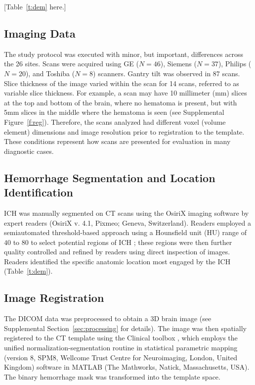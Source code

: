 \documentclass[10pt]{article}\usepackage[]{graphicx}\usepackage[]{color}
\begin{document}

[Table~\ref{t:dem} here.]


\subsection{Imaging Data}
The study protocol was executed with minor, but important, differences across the 26 sites.  Scans were acquired using GE ($N=46$), Siemens ($N=37$), Philips ($N=20$), and Toshiba ($N=8$) scanners. Gantry tilt was observed in 87 scans.  Slice thickness of the image varied within the scan for 14 scans, referred to as variable slice thickness. For example, a scan may have 10 millimeter (mm) slices at the top and bottom of the brain, where no hematoma is present, but with 5mm slices in the middle where the hematoma is seen (see Supplemental Figure~\ref{f:reg}\protect{}).  Therefore, the scans analyzed had different voxel (volume element) dimensions and image resolution prior to registration to the template.  These conditions represent how scans are presented for evaluation in many diagnostic cases.



\subsection{Hemorrhage Segmentation and Location Identification}
ICH was manually segmented on CT scans using the OsiriX imaging software by expert readers (OsiriX v. 4.1, Pixmeo; Geneva, Switzerland).  Readers employed a semiautomated threshold-based approach using a Hounsfield unit (HU) range of $40$ to $80$ to select potential regions of ICH \citep{bergstrom_variation_1977, smith_imaging_2006}; these regions were then further quality controlled and refined by readers using direct inspection of images.  Readers identified the specific anatomic location most engaged by the ICH (Table~\ref{t:dem}).

\subsection{Image Registration}
The DICOM data was preprocessed to obtain a 3D brain image (see Supplemental Section~\ref{sec:processing} for details).
The image was then spatially registered to the CT template using the Clinical toolbox \citep{rorden_age-specific_2012}, which employs the unified normalization-segmentation routine \citep{ashburner_unified_2005} in statistical parametric mapping (version 8, SPM8, Wellcome Trust Centre for Neuroimaging, London, United Kingdom) software in MATLAB (The Mathworks, Natick, Massachusetts, USA).  The binary hemorrhage mask was transformed into the template space.  
\end{document}
